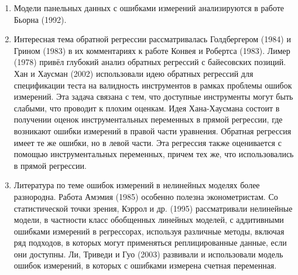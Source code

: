 \begin{enumerate}
\item Модели панельных данных с ошибками измерений анализируются в работе Бьорна (1992).
\item Интересная тема обратной регрессии рассматривалась Голдбергером (1984) и Грином (1983) в их комментариях к работе Конвея и Робертса (1983). Лимер (1978) привёл глубокий анализ обратных регрессий с байесовских позиций. Хан и Хаусман (2002) использовали идею обратных регрессий для спецификации теста на валидность инструментов в рамках проблемы ошибок измерений. Эта задача связана с тем, что доступные инструменты могут быть слабыми, что проводит к плохим оценкам. Идея Хана-Хаусмана состоит в получении оценок инструментальных переменных в прямой регрессии, где возникают ошибки измерений в правой части уравнения. Обратная регрессия имеет те же ошибки, но в левой части. Эта регрессия также оценивается с помощью инструментальных переменных, причем тех же, что использовались в прямой регрессии.
\item Литература по теме ошибок измерений в нелинейных моделях более разнородна. Работа Амэмия (1985) особенно полезна эконометристам. Со статистической точки зрения, Кэррол и др. (1995) рассматривали нелинейные модели, в частности класс обобщенных линейных моделей, с аддитивными ошибками измерений в регрессорах, используя различные методы, включая ряд подходов, в которых могут применяться реплицированные данные, если они доступны. Ли, Триведи и Гуо (2003) развивали и использовали модель ошибок измерений, в которых с ошибками измерена счетная переменная.
\end{enumerate}


